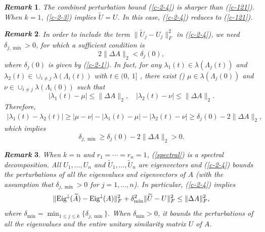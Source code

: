 \documentclass[11pt,a4paper]{article}
\numberwithin{equation}{section}
\newtheorem{Remark}{{\it Remark}}[section]
\newcommand {\wt} {\widetilde}
\begin{document}
\medskip

\begin{Remark}\label{rem211}
The combined perturbation bound (\ref{c-2-4}) is sharper than  (\ref{c-121}). When $k=1$, (\ref{c-2-3}) implies  $\wt U=U$. In this case, (\ref{c-2-4}) reduces to (\ref{c-121}).
\end{Remark}

\medskip

\begin{Remark}\label{rem24}
In order to include the term  $\|\wt U_j-U_j\|_F^2$ in (\ref{c-2-4}), we need $\delta_{j,\min}>0$, for which a sufficient condition is
 $$
 2\|\Delta A\|_2<\delta_j(0),
 $$
where $\delta_j(0)$ is given by (\ref{c-2-1}). In fact, for any $\lambda_1(t)\in\lambda(\Lambda_j(t))$ and $\lambda_2(t)\in\cup_{i\ne j}\lambda(\Lambda_i(t))$
with $t\in (0,~1]$ ,  there exist (\cite[Chapter IV, Corollary 4.10]{ss90}) $\mu\in\lambda(\Lambda_j(0))$ and $\nu\in\cup_{i\ne j}\lambda(\Lambda_i(0))$
such that
$$
|\lambda_1(t)-\mu|\leq \|\Delta A\|_2, \quad |\lambda_2(t)-\nu|\leq\|\Delta A\|_2.
$$
Therefore,
\begin{eqnarray*}
|\lambda_1(t)-\lambda_2(t)|\geq |\mu-\nu|-|\lambda_1(t)-\mu|-|\lambda_2(t)-\nu|\geq \delta_j(0)-2\|\Delta A\|_2,
\end{eqnarray*}
which implies
$$
\delta_{j,\min}\geq \delta_j(0)-2\|\Delta A\|_2>0.
$$
\end{Remark}

\medskip

\begin{Remark}\label{rem22}
When $k=n$ and $r_1=\cdots=r_n=1$, (\ref{spectral}) is a spectral decomposition.
All $U_1,\ldots,U_n$ and $\wt U_1,\ldots,\wt U_n$
are eigenvectors and (\ref{c-2-4}) bounds the perturbations of all the eigenvalues and
eigenvectors of $A$ (with the assumption that $\delta_{j,\min}>0$ for $j=1,\ldots,n$).
In particular, (\ref{c-2-4}) implies
\[
\|{\rm Eig}^{\downarrow}(\wt A)-{\rm Eig}^{\downarrow}(A)\|_F^2+\delta_{\min}^2
\|{\wt U-U}\|_F^2\le \|{\Delta A}\|_F^2,
\]
where $\delta_{\min}=\min_{1\le j\le k}\{\delta_{j,\min}\}$. When $\delta_{\min}>0$,
it bounds the perturbations of all the eigenvalues and the entire unitary similarity matrix $U$
of $A$.
\end{Remark}

\medskip
\end{document}
